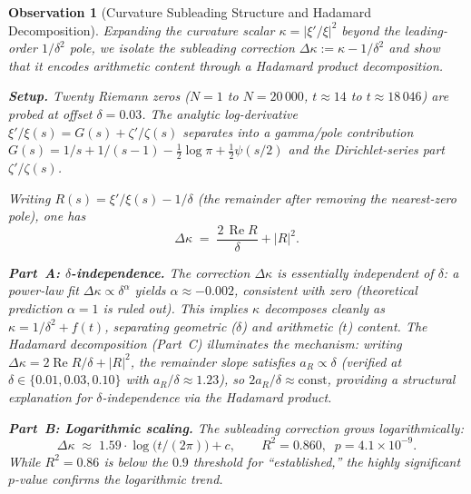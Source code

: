 \documentclass[11pt, a4paper]{article}
\theoremstyle{definition}
\theoremstyle{plain}
\newtheorem{observation}[theorem]{Observation}
\begin{document}
\begin{observation}[Curvature Subleading Structure and Hadamard Decomposition]
\label{obs:curvature_subleading}
Expanding the curvature scalar $\kappa = |\xi'/\xi|^2$ beyond the
leading-order $1/\delta^2$ pole, we isolate the \emph{subleading}
correction $\Delta\kappa := \kappa - 1/\delta^2$ and show that it
encodes arithmetic content through a Hadamard product decomposition.

\smallskip\noindent
\textbf{Setup.}\;
Twenty Riemann zeros ($N = 1$ to $N = 20\,000$, $t \approx 14$
to $t \approx 18\,046$) are probed at offset $\delta = 0.03$.
The analytic log-derivative $\xi'/\xi(s) = G(s) + \zeta'/\zeta(s)$
separates into a gamma/pole contribution
$G(s) = 1/s + 1/(s{-}1) - \tfrac{1}{2}\log\pi + \tfrac{1}{2}\psi(s/2)$
and the Dirichlet-series part $\zeta'/\zeta(s)$.

Writing $R(s) = \xi'/\xi(s) - 1/\delta$ (the remainder after
removing the nearest-zero pole), one has
\[
  \Delta\kappa
  \;=\;
  \frac{2\,\operatorname{Re} R}{\delta}
  + |R|^2.
\]

\smallskip\noindent
\textbf{Part~A: $\delta$-independence.}\;
The correction $\Delta\kappa$ is essentially independent of $\delta$:
a power-law fit $\Delta\kappa \propto \delta^{\alpha}$ yields
$\alpha \approx -0.002$, consistent with zero (theoretical
prediction $\alpha = 1$ is ruled out).  This implies $\kappa$
decomposes cleanly as
$\kappa = 1/\delta^2 + f(t)$,
separating geometric ($\delta$) and arithmetic ($t$) content.
The Hadamard decomposition (Part~C) illuminates the mechanism:
writing $\Delta\kappa = 2\operatorname{Re}R/\delta + |R|^2$,
the remainder slope satisfies $a_R \propto \delta$
(verified at $\delta \in \{0.01, 0.03, 0.10\}$ with
$a_R/\delta \approx 1.23$), so $2a_R/\delta \approx \mathrm{const}$,
providing a structural explanation for $\delta$-independence
via the Hadamard product.

\smallskip\noindent
\textbf{Part~B: Logarithmic scaling.}\;
The subleading correction grows logarithmically:
\[
  \Delta\kappa
  \;\approx\;
  1.59 \cdot \log\!\bigl(t/(2\pi)\bigr) + c,
  \qquad
  R^2 = 0.860,\;\; p = 4.1 \times 10^{-9}.
\]
While $R^2 = 0.86$ is below the $0.9$ threshold for ``established,''
the highly significant $p$-value confirms the logarithmic trend.


\end{observation}
\end{document}
